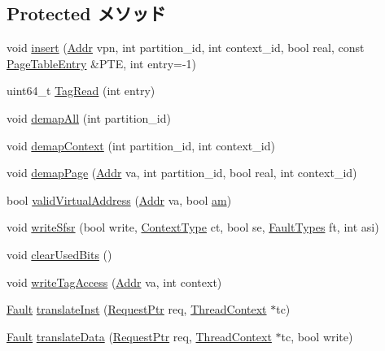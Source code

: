 \subsection*{Protected メソッド}
\begin{DoxyCompactItemize}
\item 
void \hyperlink{classSparcISA_1_1TLB_a2b2db94fc3a8f3652866d0dc2aabcf87}{insert} (\hyperlink{base_2types_8hh_af1bb03d6a4ee096394a6749f0a169232}{Addr} vpn, int partition\_\-id, int context\_\-id, bool real, const \hyperlink{classSparcISA_1_1PageTableEntry}{PageTableEntry} \&PTE, int entry=-\/1)
\item 
uint64\_\-t \hyperlink{classSparcISA_1_1TLB_aaf85d399be0a94d95fa3282faff835ea}{TagRead} (int entry)
\item 
void \hyperlink{classSparcISA_1_1TLB_a787d07e454d0dddde90f226346065ade}{demapAll} (int partition\_\-id)
\item 
void \hyperlink{classSparcISA_1_1TLB_af7e91d9c8e43607b3064697810576e28}{demapContext} (int partition\_\-id, int context\_\-id)
\item 
void \hyperlink{classSparcISA_1_1TLB_a81a25ef373ef91ac81bb1717e4c9dcb0}{demapPage} (\hyperlink{base_2types_8hh_af1bb03d6a4ee096394a6749f0a169232}{Addr} va, int partition\_\-id, bool real, int context\_\-id)
\item 
bool \hyperlink{classSparcISA_1_1TLB_aa5cff14a14bcb47f10bb095035bd6290}{validVirtualAddress} (\hyperlink{base_2types_8hh_af1bb03d6a4ee096394a6749f0a169232}{Addr} va, bool \hyperlink{namespaceSparcISA_a221d874609a3a07e22447f60e33cffdb}{am})
\item 
void \hyperlink{classSparcISA_1_1TLB_afd0c300a55c5f8ae2a678bcac2179afb}{writeSfsr} (bool write, \hyperlink{classSparcISA_1_1TLB_a856bf0f48d7d9c89d1e4216a6f0394e5}{ContextType} ct, bool se, \hyperlink{classSparcISA_1_1TLB_a8e661b580d73f1e008c8ea6fc5823822}{FaultTypes} ft, int asi)
\item 
void \hyperlink{classSparcISA_1_1TLB_aa4eb1561faa47c66c28555cbf26f4d8f}{clearUsedBits} ()
\item 
void \hyperlink{classSparcISA_1_1TLB_a7f076e15ef97f1dd3f5e128b48cb4974}{writeTagAccess} (\hyperlink{base_2types_8hh_af1bb03d6a4ee096394a6749f0a169232}{Addr} va, int context)
\item 
\hyperlink{classRefCountingPtr}{Fault} \hyperlink{classSparcISA_1_1TLB_a072afd8ed455dade4c25a85510e5a4da}{translateInst} (\hyperlink{classRequest}{RequestPtr} req, \hyperlink{classThreadContext}{ThreadContext} $\ast$tc)
\item 
\hyperlink{classRefCountingPtr}{Fault} \hyperlink{classSparcISA_1_1TLB_ad54aef66412f77e2a15a621a126dfb52}{translateData} (\hyperlink{classRequest}{RequestPtr} req, \hyperlink{classThreadContext}{ThreadContext} $\ast$tc, bool write)
\end{DoxyCompactItemize}
